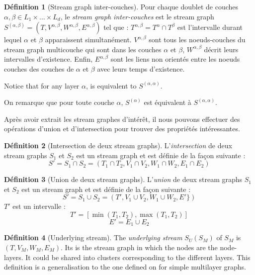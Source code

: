 \documentclass[11pt,a4paper]{article}
\theoremstyle{definition}
\newtheorem{defn}{Définition}
\theoremstyle{remark}
\theoremstyle{remark}
\begin{document}
	
	\begin{defn}[Stream graph inter-couches]	
	Pour chaque doublet de couches $\alpha, \beta \in L_1\times \dots\times L_d$, le {\em stream graph inter-couches} est le stream graph $S^{(\alpha,\beta)} = (T, V^{\alpha,\beta},W^{\alpha,\beta},E^{\alpha,\beta})$ tel que : $T^{\alpha,\beta}=T^{\alpha}\cap T^{\beta}$ est l'intervalle durant lequel $\alpha$ et $\beta$ apparaissent simultanément. $V^{\alpha,\beta}$ sont tous les noeuds-couches du stream graph multicouche qui sont dans les couches $\alpha$ et $\beta$, $W^{\alpha,\beta}$ décrit leurs intervalles d'existence. Enfin, $E^{\alpha,\beta}$ sont les liens non orientés entre les noeuds couches des couches de $\alpha$ et $\beta$ avec leurs temps d'existence.
	\end{defn}
	
	Notice that for any layer $\alpha$,  is equivalent to $S^{(\alpha,\alpha)}$.

	On remarque que pour toute couche $\alpha$, $S^{(\alpha)}$ est équivalent à $S^{(\alpha,\alpha)}$.


	Après avoir extrait les stream graphes d'intérêt, il nous pouvons effectuer des opérations d'union et d'intersection pour trouver des propriétés intéressantes.
	
	\begin{defn}[Intersection de deux stream graphs]
	L'{\em intersection} de deux stream graphs $S_1$ et $S_2$ est un stream graph et est définie de la façon suivante :
	\[
		S' = S_1 \cap S_2 = (T_1\cap T_2, V_1 \cap V_2, W_1 \cap W_2, E_1\cap E_2)
	\]
	\end{defn}
	

	\begin{defn}[Union de deux stream graphs]
	L'{\em union} de deux stream graphs $S_1$ et $S_2$ est un stream graph et est définie de la façon suivante :
	\[
		S' = S_1 \cup S_2 = (T', V_1 \cup V_2, W_1 \cup W_2, E' \})
	\]
	$T'$ est un intervalle :
	\[
		T' = [\min(T_1,T_2),\max(T_1,T_2)]
	\]
	\[
		E' = E_1 \cup E_2 
	\]
	
	\end{defn}
	
	
	\begin{defn}[Underlying stream]
		The {\em underlying stream } $S_U(S_M)$ of $S_M$ is $(T,V_M,W_M,E_M)$. Its is the stream graph in which the nodes are the node-layers. It could be shared into clusters corresponding to the different layers. This definition is a generalisation to the one defined on \cite{mlkiv} for simple multilayer graphs.
	\end{defn}
	
\end{document}
